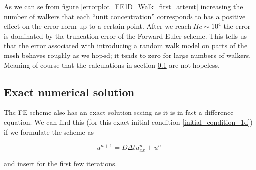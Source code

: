 As we can se from figure \ref{errorplot_FE1D_Walk_first_attemt} increasing the number of walkers that each ``unit concentration'' corresponds to has a positive effect on the error norm up to a certain point. 
After we reach $Hc \sim 10^4$ the error is dominated by the truncation error of the Forward Euler scheme. 
This tells us that the error associated with introducing a random walk model on parts of the mesh behaves roughly as we hoped; it tends to zero for large numbers of walkers. 
Meaning of course that the calculations in section \ref{} are not hopeless.

\subsection{Exact numerical solution}

The FE scheme also has an exact solution seeing as it is in fact a difference equation. 
We can find this (for this exact initial condition \ref{initial_condition_1d}) if we formulate the scheme as 

\begin{equation}
 u^{n+1} = D\Delta t u_{xx}^n + u^n
\end{equation}

and insert for the first few iterations. 

